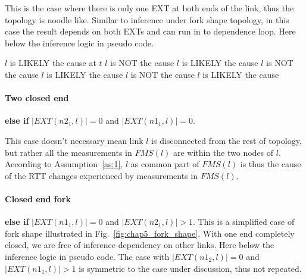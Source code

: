 This is the case where there is only one \ac{EXT} at both ends of the link, thus the topology is noodle like.
Similar to inference under fork shape topology, in this case the result depends on both \acp{EXT} and can run in to dependence loop. Here below the inference logic in pseudo code.

\begin{algorithmic}
	\State $l$ is LIKELY the cause at $t$ 
\Else {}
	 
			\State $l$ is NOT the cause 
		\Else
			\State $l$ is LIKELY the cause 
		\EndIf
	 
			\State $l$ is NOT the cause 
		\Else
			\State $l$ is LIKELY the cause 
		\EndIf
	\Else {}
			\State $l$ is NOT the cause 
		\Else
			\State $l$ is LIKELY the cause 
		\EndIf
	\EndIf
\EndIf
\end{algorithmic}

\paragraph{Two closed end} \textbf{else if} $|EXT(n2_1,l)| = 0$ and $|EXT(n1_1,l)| = 0$.

This case doesn't necessary mean link $l$ is disconnected from the rest of topology, but rather all the measurements in $FMS(l)$ are within the two nodes of $l$. According to Assumption~\ref{as:1}, $l$ as common part of $FMS(l)$ is thus the cause of the RTT changes experienced by measurements in $FMS(l)$.


\paragraph{Closed end fork} \textbf{else if } $|EXT(n1_1,l)| = 0$ and $|EXT(n2_1,l)| > 1$.
This is a simplified case of fork shape illustrated in Fig.~\ref{fig:chap5_fork_shape}.
With one end completely closed, we are free of inference dependency on other links.
Here below the inference logic in pseudo code. The case with $|EXT(n1_2,l)| = 0$ and $|EXT(n1_1,l)| > 1$ is symmetric to the case under discussion, thus not repeated.

